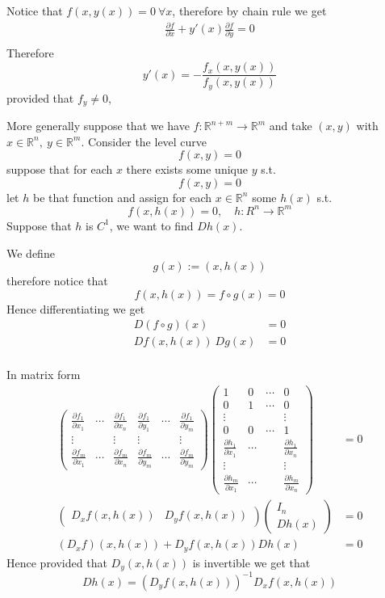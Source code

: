 \documentclass[11pt,a4paper]{article}
\theoremstyle{definition}
\theoremstyle{plain}
\theoremstyle{remark}
\newcommand{\R}{\mathbb{R}}
\begin{document}
Notice that $f(x,y(x)) = 0 \ \forall x$, therefore by chain rule we get 
\begin{align*}
    \frac{\partial f}{\partial x} + y'(x) \frac{\partial f}{\partial y} = 0 \\
\end{align*}
Therefore 
$$y'(x) = - \frac{f_x (x,y(x))}{f_y(x,y(x))}$$
provided that $f_y \ne 0$, 

More generally suppose that we have $f \colon \R^{n + m} \to \R^m$ and take $(x, y)$ with $x \in \R^n, \ y \in \R^m$. 
Consider the level curve 
$$f(x,y) = 0$$
suppose that for each $x$ there exists some unique $y$ s.t. 
$$f(x,y) = 0$$
let $h$ be that function and assign for each $x \in \R^n$ some $h(x)$ s.t. 
$$f(x, h(x)) = 0, \quad h \colon R^n \to \R^m$$
Suppose that $h$ is $C^1$, we want to find $Dh(x)$. 

We define 
$$g(x) := (x, h(x))$$
therefore notice that 
$$f(x, h(x)) = f \circ g (x) = 0$$
Hence differentiating we get 
\begin{align*}
    D(f \circ g) (x) &= 0 \\
    Df(x, h(x)) \ Dg(x) &= 0 \\
\end{align*}

In matrix form 
\begin{align*}
     \begin{pmatrix}
        \frac{\partial f_1}{\partial x_1} & \cdots & \frac{\partial f_1}{\partial x_n} & \frac{\partial f_1}{\partial y_1} & \cdots & \frac{\partial f_1}{\partial y_m} \\
        \vdots & & \vdots & \vdots & & \vdots \\
        \frac{\partial f_m}{\partial x_1} & \cdots & \frac{\partial f_m}{\partial x_n} & \frac{\partial f_m}{\partial y_m} & \cdots & \frac{\partial f_m}{\partial y_m}
    \end{pmatrix}
    \begin{pmatrix}
        1 & 0 & \cdots & 0 \\
        0 & 1 & \cdots &  0 \\
        \vdots & & &\vdots \\
        0 & 0 & \cdots & 1 \\
        \frac{\partial h_1}{\partial x_1} & \cdots & & \frac{\partial h_1}{\partial x_n} \\
        \vdots & & &\vdots \\
        \frac{\partial h_m}{\partial x_1} & \cdots & & \frac{\partial h_m}{\partial x_n}
     \end{pmatrix}&= 0 \\
    \begin{pmatrix}
        D_xf (x, h(x)) & D_yf (x,h(x))
    \end{pmatrix} \begin{pmatrix}
        I_n \\ Dh(x)
    \end{pmatrix}&= 0 \\
    (D_xf) (x,h(x)) + D_yf(x,h(x)) Dh(x) &= 0
\end{align*}
Hence provided that $D_y(x,h(x))$ is invertible we get that 
$$Dh(x) = (D_y f(x,h(x)))^{-1} D_xf(x,h(x))$$
\end{document}
